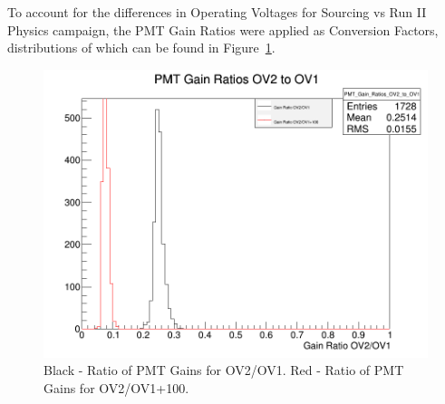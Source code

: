 To account for the differences in Operating Voltages for Sourcing vs Run II Physics campaign, the PMT Gain Ratios were applied as Conversion Factors, distributions of which can be found in Figure~\ref{fig:PMT_Gains}.
\begin{figure}[!h]
	\begin{center}
		\includegraphics[width=.5\textwidth]{figures/ch_hfcalibration/GainRatios.png}
		\caption
		{Black - Ratio of PMT Gains for OV2/OV1. Red - Ratio of PMT Gains for OV2/OV1+100.}
		\label{fig:PMT_Gains}
	\end{center}
\end{figure}




